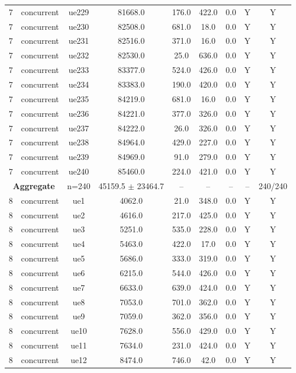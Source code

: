 \begin{table}[ht]
\begin{tabular}{|c|c|c|c|c|c|c|c|c|}
7 & concurrent & ue229 & 81668.0 & 176.0 & 422.0 & 0.0 & Y & Y \\
7 & concurrent & ue230 & 82508.0 & 681.0 & 18.0 & 0.0 & Y & Y \\
7 & concurrent & ue231 & 82516.0 & 371.0 & 16.0 & 0.0 & Y & Y \\
7 & concurrent & ue232 & 82530.0 & 25.0 & 636.0 & 0.0 & Y & Y \\
7 & concurrent & ue233 & 83377.0 & 524.0 & 426.0 & 0.0 & Y & Y \\
7 & concurrent & ue234 & 83383.0 & 190.0 & 420.0 & 0.0 & Y & Y \\
7 & concurrent & ue235 & 84219.0 & 681.0 & 16.0 & 0.0 & Y & Y \\
7 & concurrent & ue236 & 84221.0 & 377.0 & 326.0 & 0.0 & Y & Y \\
7 & concurrent & ue237 & 84222.0 & 26.0 & 326.0 & 0.0 & Y & Y \\
7 & concurrent & ue238 & 84964.0 & 429.0 & 227.0 & 0.0 & Y & Y \\
7 & concurrent & ue239 & 84969.0 & 91.0 & 279.0 & 0.0 & Y & Y \\
7 & concurrent & ue240 & 85460.0 & 224.0 & 421.0 & 0.0 & Y & Y \\
\multicolumn{2}{|c|}{\textbf{Aggregate}} & n=240 & 45159.5 $\pm$ 23464.7 & -- & -- & -- & -- & 240/240 \\
\hline
8 & concurrent & ue1 & 4062.0 & 21.0 & 348.0 & 0.0 & Y & Y \\
8 & concurrent & ue2 & 4616.0 & 217.0 & 425.0 & 0.0 & Y & Y \\
8 & concurrent & ue3 & 5251.0 & 535.0 & 228.0 & 0.0 & Y & Y \\
8 & concurrent & ue4 & 5463.0 & 422.0 & 17.0 & 0.0 & Y & Y \\
8 & concurrent & ue5 & 5686.0 & 333.0 & 319.0 & 0.0 & Y & Y \\
8 & concurrent & ue6 & 6215.0 & 544.0 & 426.0 & 0.0 & Y & Y \\
8 & concurrent & ue7 & 6633.0 & 639.0 & 424.0 & 0.0 & Y & Y \\
8 & concurrent & ue8 & 7053.0 & 701.0 & 362.0 & 0.0 & Y & Y \\
8 & concurrent & ue9 & 7059.0 & 362.0 & 356.0 & 0.0 & Y & Y \\
8 & concurrent & ue10 & 7628.0 & 556.0 & 429.0 & 0.0 & Y & Y \\
8 & concurrent & ue11 & 7634.0 & 231.0 & 424.0 & 0.0 & Y & Y \\
8 & concurrent & ue12 & 8474.0 & 746.0 & 42.0 & 0.0 & Y & Y \\

\end{tabular}
\end{table}
